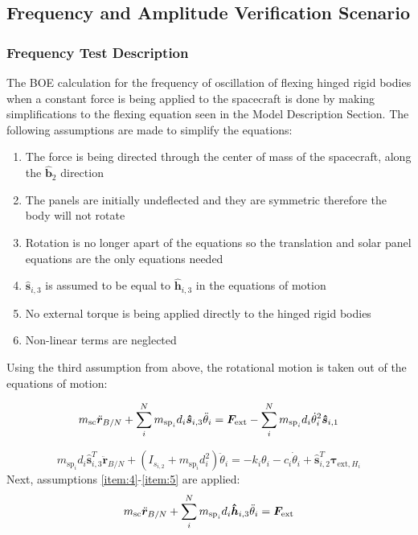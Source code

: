 \subsection{Frequency and Amplitude Verification Scenario}

\subsubsection{Frequency Test Description}

The BOE calculation for the frequency of oscillation of flexing hinged rigid bodies when a constant force is being applied to the spacecraft is done by making simplifications to the flexing equation seen in the Model Description Section. The following assumptions are made to simplify the equations:

\begin{enumerate}
	\item The force is being directed through the center of mass of the spacecraft, along the $\hat{\bm b}_2$ direction
	\item The panels are initially undeflected and they are symmetric therefore the body will not rotate
	\item Rotation is no longer apart of the equations so the translation and solar panel equations are the only equations needed
	\item $\hat{\bm s}_{i,3}$ is assumed to be equal to $\hat{\bm h}_{i,3}$ in the equations of motion \label{item:4}
	\item No external torque is being applied directly to the hinged rigid bodies
	\item Non-linear terms are neglected \label{item:5}
\end{enumerate}
Using the third assumption from above, the rotational motion is taken out of the equations of motion:

\begin{equation}
m_{\text{sc}} \ddot{\bm r}_{B/N}+\sum_{i}^{N}m_{\text{sp}_i} d_i  \bm{\hat{s}}_{i,3}\ddot{\theta}_i = \bm F_{\textnormal{ext}} -\sum_{i}^{N}m_{\text{sp}_i}d_i\dot{\theta}_i^2 \bm{\hat{s}}_{i,1}
\label{eq:Rbddot6}
\end{equation}

\begin{equation}
m_{\text{sp}_i} d_i \hat{\bm s}_{i,3}^{T} \ddot{\bm r}_{B/N} 
+ \left( I_{s_{i,2}} + m_{\text{sp}_i} d_i^{2} \right) \ddot \theta_i 
= - k_i \theta_i - c_i \dot\theta_i + \hat{\bm s}_{i,2}^T \bm \tau_{\text{ext},H_i}  
\label{eq:solar_panel_final9}
\end{equation}
Next, assumptions \ref{item:4}-\ref{item:5} are applied:
\begin{equation}
m_{\text{sc}} \ddot{\bm r}_{B/N}+\sum_{i}^{N}m_{\text{sp}_i} d_i  \bm{\hat{h}}_{i,3}\ddot{\theta}_i = \bm F_{\textnormal{ext}}
\label{eq:Rbddot7}
\end{equation}

